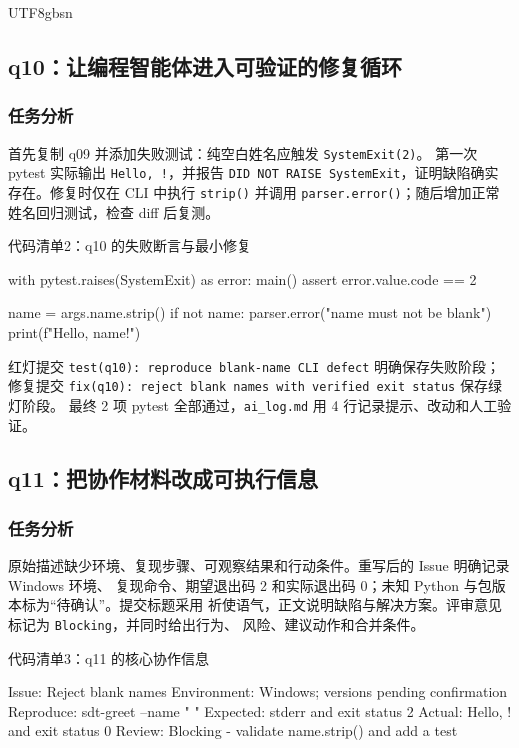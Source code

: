\documentclass[11pt]{article}
\begin{document}
\begin{CJK*}{UTF8}{gbsn}
\subsection{q10：让编程智能体进入可验证的修复循环}
\subsubsection{任务分析}
首先复制 q09 并添加失败测试：纯空白姓名应触发 \texttt{SystemExit(2)}。
第一次 pytest 实际输出 \texttt{Hello,    !}，并报告
\texttt{DID NOT RAISE SystemExit}，证明缺陷确实存在。修复时仅在 CLI 中执行
\texttt{strip()} 并调用 \texttt{parser.error()}；随后增加正常姓名回归测试，检查 diff 后复测。

\begin{center}\color{SlateGray}代码清单2：q10 的失败断言与最小修复\end{center}
\begin{CodeBlock}
with pytest.raises(SystemExit) as error:
    main()
assert error.value.code == 2

name = args.name.strip()
if not name:
    parser.error("name must not be blank")
print(f"Hello, {name}!")
\end{CodeBlock}

\begin{resultbox}
红灯提交 \texttt{test(q10): reproduce blank-name CLI defect} 明确保存失败阶段；
修复提交 \texttt{fix(q10): reject blank names with verified exit status} 保存绿灯阶段。
最终 2 项 pytest 全部通过，\texttt{ai\_log.md} 用 4 行记录提示、改动和人工验证。
\end{resultbox}

\subsection{q11：把协作材料改成可执行信息}
\subsubsection{任务分析}
原始描述缺少环境、复现步骤、可观察结果和行动条件。重写后的 Issue 明确记录 Windows 环境、
复现命令、期望退出码 2 和实际退出码 0；未知 Python 与包版本标为“待确认”。提交标题采用
祈使语气，正文说明缺陷与解决方案。评审意见标记为 \texttt{Blocking}，并同时给出行为、
风险、建议动作和合并条件。

\begin{center}\color{SlateGray}代码清单3：q11 的核心协作信息\end{center}
\begin{CodeBlock}
Issue: Reject blank names
Environment: Windows; versions pending confirmation
Reproduce: sdt-greet --name " "
Expected: stderr and exit status 2
Actual: Hello,  ! and exit status 0
Review: Blocking - validate name.strip() and add a test
\end{CodeBlock}


\end{CJK*}
\end{document}
